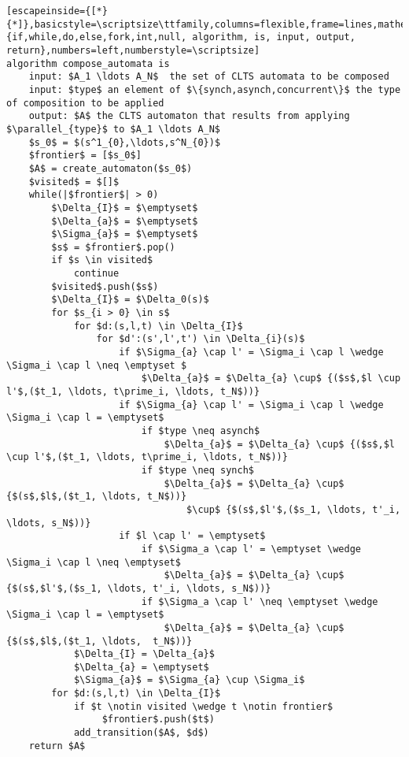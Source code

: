 \renewcommand{\ttdefault}{pcr}
\begin{lstlisting}[escapeinside={[*}{*]},basicstyle=\scriptsize\ttfamily,columns=flexible,frame=lines,mathescape=true,xleftmargin=3.0ex,keywordstyle=\textbf,morekeywords={if,while,do,else,fork,int,null, algorithm, is, input, output, return},numbers=left,numberstyle=\scriptsize]
algorithm compose_automata is
	input: $A_1 \ldots A_N$  the set of CLTS automata to be composed
	input: $type$ an element of $\{synch,asynch,concurrent\}$ the type of composition to be applied
	output: $A$ the CLTS automaton that results from applying $\parallel_{type}$ to $A_1 \ldots A_N$
	$s_0$ = $(s^1_{0},\ldots,s^N_{0})$
	$frontier$ = [$s_0$]
	$A$ = create_automaton($s_0$)
	$visited$ = $[]$
	while(|$frontier$| > 0)
		$\Delta_{I}$ = $\emptyset$
		$\Delta_{a}$ = $\emptyset$
		$\Sigma_{a}$ = $\emptyset$		
		$s$ = $frontier$.pop()
		if $s \in visited$
			continue
		$visited$.push($s$)
		$\Delta_{I}$ = $\Delta_0(s)$
		for $s_{i > 0} \in s$ 
			for $d:(s,l,t) \in \Delta_{I}$
				for $d':(s',l',t') \in \Delta_{i}(s)$
					if $\Sigma_{a} \cap l' = \Sigma_i \cap l \wedge \Sigma_i \cap l \neq \emptyset $
						$\Delta_{a}$ = $\Delta_{a} \cup$ {($s$,$l \cup l'$,($t_1, \ldots, t\prime_i, \ldots, t_N$))}
					if $\Sigma_{a} \cap l' = \Sigma_i \cap l \wedge \Sigma_i \cap l = \emptyset$
						if $type \neq asynch$
							$\Delta_{a}$ = $\Delta_{a} \cup$ {($s$,$l \cup l'$,($t_1, \ldots, t\prime_i, \ldots, t_N$))}
						if $type \neq synch$							
							$\Delta_{a}$ = $\Delta_{a} \cup$ {$(s$,$l$,($t_1, \ldots, t_N$))} 
								$\cup$ {$(s$,$l'$,($s_1, \ldots, t'_i, \ldots, s_N$))}
					if $l \cap l' = \emptyset$
						if $\Sigma_a \cap l' = \emptyset \wedge \Sigma_i \cap l \neq \emptyset$
							$\Delta_{a}$ = $\Delta_{a} \cup$ {$(s$,$l'$,($s_1, \ldots, t'_i, \ldots, s_N$))} 
						if $\Sigma_a \cap l' \neq \emptyset \wedge \Sigma_i \cap l = \emptyset$
							$\Delta_{a}$ = $\Delta_{a} \cup$ {$(s$,$l$,($t_1, \ldots,  t_N$))} 							
			$\Delta_{I} = \Delta_{a}$						
			$\Delta_{a} = \emptyset$						
			$\Sigma_{a}$ = $\Sigma_{a} \cup \Sigma_i$
		for $d:(s,l,t) \in \Delta_{I}$
			if $t \notin visited \wedge t \notin frontier$ 
				 $frontier$.push($t$)
			add_transition($A$, $d$)			
	return $A$

\end{lstlisting}